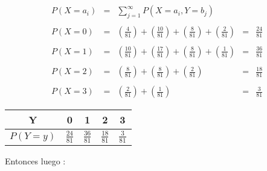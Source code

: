 \documentclass[12pt]{article}
\begin{document}
\begin{equation*}
    \begin{array}{rclcl}
        \\
        \displaystyle P\left(X = a_i\right) & = & \displaystyle \sum_{j=1}^{\infty} P \left(X = a_i,Y = b_j\right)
        \\
        \\
        \displaystyle P\left(X = 0\right)   & = & \displaystyle \left( \frac{4}{81}\right) + \left(\frac{10}{81}\right) + \left(\frac{8}{81}\right) +\left( \frac{2}{81}\right)     & = &  \displaystyle \frac{24}{81}
        \\
        \\
        \displaystyle  P\left(X = 1\right)   & = & \displaystyle \left(\frac{10}{81}\right) + \left(\frac{17}{81}\right) + \left(\frac{8}{81}\right)  + \left(\frac{1}{81}\right)   & = & \displaystyle \frac{36}{81}
        \\
        \\
        \displaystyle P\left(X = 2\right)   & = & \displaystyle \left(\frac{8}{81}\right) + \left(\frac{8}{81}\right) + \left(\frac{2}{81}\right)                                           & = & \displaystyle \frac{18}{81}
        \\
        \\
        \displaystyle P\left(X = 3\right)   & = & \displaystyle  \left(\frac{2}{81}\right) + \left(\frac{1}{81}\right)                                                                 & = & \displaystyle \frac{3}{81}
    \end{array}
\end{equation*}


\begin{center}
    \renewcommand{\arraystretch}{1.5}
    \begin{tabular}{|c|c|c|c|c|}
        \hline
        Y                   & 0               & 1               & 2               & 3
        \\
        \hline
        $P\left(Y=y\right)$ & $\frac{24}{81}$ & $\frac{36}{81}$ & $\frac{18}{81}$ & $\frac{3}{81}$
        \\
        \hline
    \end{tabular}
\end{center}


Entonces luego :
\end{document}
